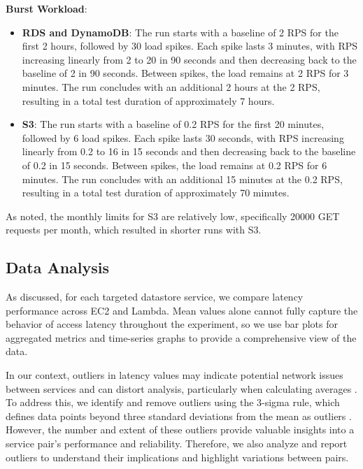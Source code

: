 \textbf{Burst Workload}:
\begin{itemize}
	\item \textbf{RDS and DynamoDB}: The run starts with a baseline of 2 RPS for the first 2 hours, followed by 30 load spikes. Each spike lasts 3 minutes, with RPS increasing linearly from 2 to 20 in 90 seconds and then decreasing back to the baseline of 2 in 90 seconds. Between spikes, the load remains at 2 RPS for 3 minutes. The run concludes with an additional 2 hours at the 2 RPS, resulting in a total test duration of approximately 7 hours.
	\item \textbf{S3}: The run starts with a baseline of 0.2 RPS for the first 20 minutes, followed by 6 load spikes. Each spike lasts 30 seconds, with RPS increasing linearly from 0.2 to 16 in 15 seconds and then decreasing back to the baseline of 0.2 in 15 seconds. Between spikes, the load remains at 0.2 RPS for 6 minutes. The run concludes with an additional 15 minutes at the 0.2 RPS, resulting in a total test duration of approximately 70 minutes.
\end{itemize}

As noted, the monthly limits for S3 are relatively low, specifically 20000 GET requests per month, which resulted in shorter runs with S3.

\subsection{Data Analysis}
\label{sec:analysis}

As discussed, for each targeted datastore service, we compare latency performance across EC2 and Lambda. Mean values alone cannot fully capture the behavior of access latency throughout the experiment, so we use bar plots for aggregated metrics and time-series graphs to provide a comprehensive view of the data.

In our context, outliers in latency values may indicate potential network issues between services and can distort analysis, particularly when calculating averages \cite{book_bermbach_cloud_service_benchmarking}. To address this, we identify and remove outliers using the 3-sigma rule, which defines data points beyond three standard deviations from the mean as outliers \cite{book_han_data_mining}. However, the number and extent of these outliers provide valuable insights into a service pair's performance and reliability. Therefore, we also analyze and report outliers to understand their implications and highlight variations between pairs.
